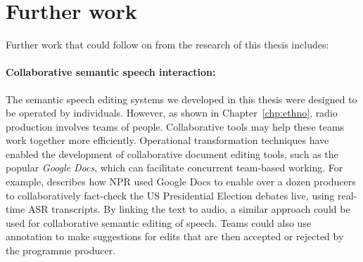 











\section{Further work}\label{sec:conclusions-further}

Further work that could follow on from the research of this thesis includes:

\paragraph{Collaborative semantic speech interaction:}

The semantic speech editing systems we developed in this thesis were designed to be operated by individuals.
However, as shown in Chapter~\ref{chp:ethno}, radio production involves teams of people.  Collaborative tools may help
these teams work together more efficiently.  Operational transformation techniques \citep{Sun2004} have enabled the
development of collaborative document editing tools, such as the popular \textit{Google Docs}, which can facilitate
concurrent team-based working.  For example, \citet{Fisher2016} describes how NPR used Google Docs to enable over a
dozen producers to collaboratively fact-check the US Presidential Election debates live, using real-time ASR
transcripts. By linking the text to audio, a similar approach could be used for collaborative semantic editing of
speech. Teams could also use annotation to make suggestions for edits that are then accepted or rejected by the
programme producer.

